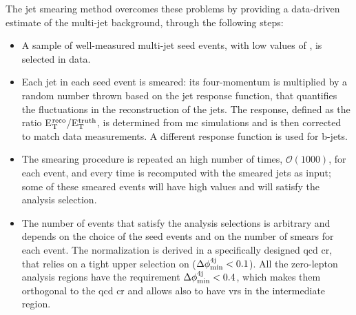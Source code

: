 The jet smearing method overcomes these problems by providing a data-driven estimate of the multi-jet background, through the following steps:
\begin{itemize}
\item A sample of well-measured multi-jet seed events, with low values of \met, is selected in data.

\item Each jet in each seed event is smeared: its four-momentum is multiplied by a random number thrown based on the jet response function, that quantifies the fluctuations in the \pt reconstruction of the jets. The response, defined as the ratio E$_{\rm{T}}^{\rm{reco}}$/E$_{\rm{T}}^{\rm{truth}}$, is determined from \gls{mc} simulations and is then corrected to match data measurements. 
A different response function is used for b-jets. 

\item The smearing procedure is repeated an high number of times, $\mathcal{O}(1000)$, for each event, and every time \met is recomputed with the smeared jets as input; some of these smeared events will have high \met values and will satisfy the analysis selection.

\item The number of events that satisfy the analysis selections is arbitrary and depends on the choice of the seed events and on the number of smears for each event. The normalization is derived in a specifically designed \gls{qcd} \gls{cr}, that relies on a tight upper selection on \dphimin ($\Delta\phi_{\rm{min}}^{4{\rm{j}}} < 0.1$). All the zero-lepton analysis regions have the requirement $\Delta\phi_{\rm{min}}^{4{\rm{j}}} < 0.4$, which makes them orthogonal to the \gls{qcd} \gls{cr} and allows also to have \glspl{vr} in the intermediate region. 
\end{itemize}




